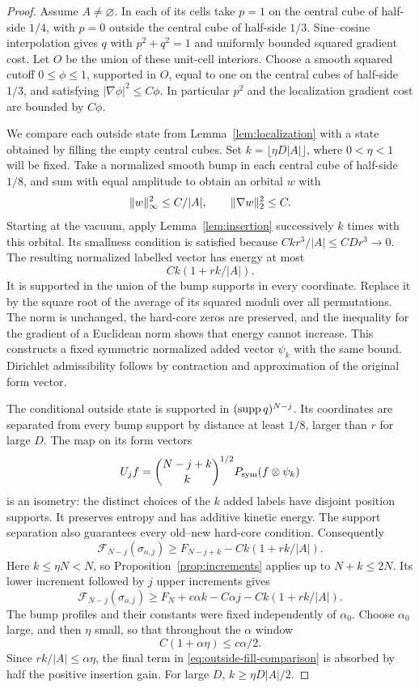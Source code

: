 \begin{proof}
Assume $A\ne\varnothing$. In each of its cells take $p=1$ on
the central cube of half-side $1/4$, with $p=0$ outside the central
cube of half-side $1/3$. Sine--cosine interpolation gives $q$ with
$p^2+q^2=1$ and uniformly bounded squared gradient cost. Let $O$
be the union of these unit-cell interiors. Choose a smooth squared
cutoff $0\le\phi\le1$, supported in $O$, equal to one on the
central cubes of half-side $1/3$, and satisfying
$|\nabla\phi|^2\le C\phi$. In particular $p^2$ and the
localization gradient cost are bounded by $C\phi$.

We compare each outside state from Lemma~\ref{lem:localization}
with a state obtained by filling the empty central cubes. Set
$k=\lfloor\eta D|A|\rfloor$, where $0<\eta<1$ will be fixed.
Take a normalized smooth bump in each central cube of half-side
$1/8$, and sum with equal amplitude to obtain an orbital $w$ with
\[
 \lVert w\rVert_\infty^2\le C/|A|,\qquad
 \lVert\nabla w\rVert_2^2\le C.
\]
Starting at the vacuum, apply Lemma~\ref{lem:insertion}
successively $k$ times with this orbital. Its smallness condition is
satisfied because
$Ckr^3/|A|\le CD r^3\to0$. The resulting normalized
labelled vector has energy at most
\begin{equation}\label{eq:fill-cost}
 Ck(1+rk/|A|).
\end{equation}
It is supported in the union of the bump supports in every coordinate.
Replace it by the square root of the average of its squared moduli
over all permutations. The norm is unchanged, the hard-core zeros
are preserved, and the inequality for the gradient of a Euclidean
norm shows that energy cannot increase. This constructs a fixed
symmetric normalized added vector $\psi_k$ with the same bound.
Dirichlet admissibility follows by contraction and approximation of
the original form vector.

The conditional outside state is supported in
$(\operatorname{supp} q)^{N-j}$. Its coordinates are separated from every bump
support by distance at least $1/8$, larger than $r$ for large
$D$. The map on its form vectors
\[
 U_jf=\binom{N-j+k}{k}^{1/2}
       P_{\rm sym}(f\otimes\psi_k)
\]
is an isometry: the distinct choices of the $k$ added labels have
disjoint position supports. It preserves entropy and has additive
kinetic energy. The support separation also guarantees every
old--new hard-core condition. Consequently
\[
 \mathcal F_{N-j}(\sigma_{o,j})
 \ge F_{N-j+k}-Ck(1+rk/|A|).
\]
Here $k\le\eta N<N$, so Proposition~\ref{prop:increments}
applies up to $N+k\le2N$. Its lower increment followed by $j$
upper increments gives
\begin{equation}\label{eq:outside-fill-comparison}
 \mathcal F_{N-j}(\sigma_{o,j})
 \ge F_N+c\alpha k-C\alpha j-Ck(1+rk/|A|).
\end{equation}
The bump profiles and their constants were fixed independently of
$\alpha_0$. Choose $\alpha_0$ large, and then $\eta$ small,
so that throughout the $\alpha$ window
\[
 C(1+\alpha\eta)\le c\alpha/2.
\]
Since $rk/|A|\le\alpha\eta$, the final term in
\eqref{eq:outside-fill-comparison} is absorbed by half the positive
insertion gain. For large $D$, $k\ge\eta D|A|/2$.


\end{proof}
